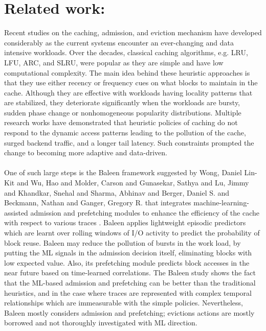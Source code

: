 \documentclass[sigconf]{acmart}
\begin{document}
{\clearpage
\section{Related work:}
\large Recent studies on the caching, admission, and eviction mechanism have developed considerably as the current systems encounter an ever-changing and data intensive workloads. Over the decades, classical caching algorithms, e.g. LRU, LFU, ARC, and SLRU, were popular as they are simple and have low computational complexity. The main idea behind these heuristic approaches is that they use either recency or frequency cues on what blocks to maintain in the cache. Although they are effective with workloads having locality patterns that are stabilized, they deteriorate significantly when the workloads are bursty, sudden phase change or nonhomogeneous popularity distributions. Multiple research works have demonstrated that heuristic policies of caching do not respond to the dynamic access patterns leading to the pollution of the cache, surged backend traffic, and a longer tail latency. Such constraints prompted the change to becoming more adaptive and data-driven.\\
\\One of such large steps is the Baleen framework suggested by Wong, Daniel Lin-Kit and Wu, Hao and Molder, Carson and Gunasekar, Sathya and Lu, Jimmy and Khandkar, Snehal and Sharma, Abhinav and Berger, Daniel S. and Beckmann, Nathan and Ganger, Gregory R. that integrates machine-learning-assisted admission and prefetching modules to enhance the efficiency of the cache with respect to various traces \cite{wong2024baleen}. Baleen applies lightweight episodic predictors which are learnt over rolling windows of I/O activity to predict the probability of block reuse. Baleen may reduce the pollution of bursts in the work load, by putting the ML signals in the admission decision itself, eliminating blocks with low expected value. Also, its prefetching module predicts block accesses in the near future based on time-learned correlations. The Baleen study shows the fact that the ML-based admission and prefetching can be better than the traditional heuristics, and in the case where traces are represented with complex temporal relationships which are immeasurable with the simple policies. Nevertheless, Baleen mostly considers admission and prefetching; evictions actions are mostly borrowed and not thoroughly investigated with ML direction.\\
}
\end{document}
